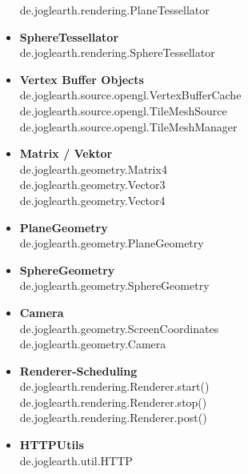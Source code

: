\documentclass[10pt]{scrreprt}
\begin{document}
\begin{itemize}
de.joglearth.rendering.PlaneTessellator
\item \textbf{SphereTessellator}\\
de.joglearth.rendering.SphereTessellator
\item \textbf{Vertex Buffer Objects}\\
de.joglearth.source.opengl.VertexBufferCache\\
de.joglearth.source.opengl.TileMeshSource\\
de.joglearth.source.opengl.TileMeshManager
\item \textbf{Matrix / Vektor}\\
de.joglearth.geometry.Matrix4\\
de.joglearth.geometry.Vector3\\
de.joglearth.geometry.Vector4\\
\item \textbf{PlaneGeometry}\\
de.joglearth.geometry.PlaneGeometry
\item \textbf{SphereGeometry}\\
de.joglearth.geometry.SphereGeometry
\item \textbf{Camera}\\
de.joglearth.geometry.ScreenCoordinates\\
de.joglearth.geometry.Camera
\item \textbf{Renderer-Scheduling}\\
de.joglearth.rendering.Renderer.start()\\
de.joglearth.rendering.Renderer.stop()\\
de.joglearth.rendering.Renderer.post()
\item \textbf{HTTPUtils}\\
de.joglearth.util.HTTP
\end{itemize}

\vspace{5mm}
\end{document}
